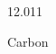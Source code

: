 \documentclass[12pt]{article}
\begin{document}
\hfill{}
\vfill
\begin{center}
  {\fontsize{50}{60}
  }

  12.011

Carbon
\end{center}
\vfill
\end{document}
